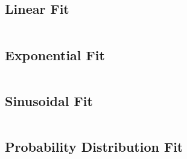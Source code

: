 \documentclass[10pt, a4paper]{article}
\begin{document}
\subsection{Linear Fit}\label{app:linear}
\inputminted{python}{./code/linear_fit.py}

\pagebreak
\subsection{Exponential Fit}\label{app:exponential}
\inputminted{python}{./code/exponential_fit.py}

\pagebreak
\subsection{Sinusoidal Fit}\label{app:sinusoidal}
\inputminted{python}{./code/sin_fit.py}

\pagebreak
\subsection{Probability Distribution Fit}\label{app:gauss}
\inputminted{python}{./code/gaussian_fit.py}
\end{document}
